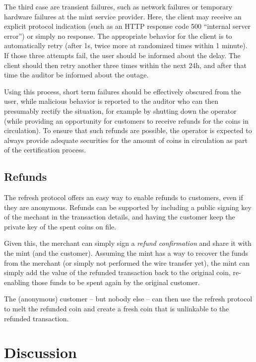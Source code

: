 \documentclass{llncs}
\begin{document}
The third case are transient failures, such as network failures or
temporary hardware failures at the mint service provider.  Here, the
client may receive an explicit protocol indication (such as an HTTP
response code 500 ``internal server error'') or simply no response.
The appropriate behavior for the client is to automatically retry
(after 1s, twice more at randomized times within 1 minute). If those
three attempts fail, the user should be informed about the delay.  The
client should then retry another three times within the next 24h, and
after that time the auditor be informed about the outage.

Using this process, short term failures should be effectively obscured
from the user, while malicious behavior is reported to the auditor who
can then presumably rectify the situation, for example by shutting
down the operator (while providing an opportunity for customers to
receive refunds for the coins in circulation).  To ensure that such
refunds are possible, the operator is expected to always provide
adequate securities for the amount of coins in circulation as part of
the certification process.

\subsection{Refunds}

The refresh protocol offers an easy way to enable refunds to
customers, even if they are anonymous.  Refunds can be supported
by including a public signing key of the mechant in the transaction
details, and having the customer keep the private key of the spent
coins on file.

Given this, the merchant can simply sign a {\em refund confirmation}
and share it with the mint (and the customer).  Assuming the mint has
a way to recover the funds from the merchant (or simply not performed
the wire transfer yet), the mint can simply add the value of the
refunded transaction back to the original coin, re-enabling those
funds to be spent again by the original customer.

The (anonymous) customer -- but nobody else -- can then use the
refresh protocol to melt the refunded coin and create a fresh coin
that is unlinkable to the refunded transaction.


\section{Discussion}
\end{document}
